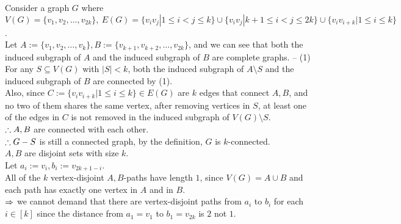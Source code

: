 \setcounter{pr}{0}
\begin{pr}
Consider a graph $G$ where $V(G)=\{v_1, v_2, \dots, v_{2k}\},\ E(G)=\{v_iv_j|1\leq i<j\leq k\}\cup\{v_iv_j|k+1\leq i<j\leq2k\}\cup\{v_iv_{i+k}|1\leq i\leq k\}$.\\
Let $A:=\{v_1, v_2, \dots, v_k\}, B:=\{v_{k+1}, v_{k+2}, \dots, v_{2k}\}$, and we can see that both the induced subgraph of $A$ and the induced subgraph of $B$ are complete graphs. -- (1)\\
For any $S\subseteq V(G)$ with $|S|<k$, both the induced subgraph of $A\setminus S$ and the induced subgraph of $B$ are connected by (1).\\
Also, since $C:=\{v_iv_{i+k}|1\leq i\leq k\}\in E(G)$ are $k$ edges that connect $A, B$, and no two of them shares the same vertex, after removing vertices in $S$, at least one of the edges in $C$ is not removed in the induced subgraph of $V(G)\setminus S$.\\
$\therefore A, B$ are connected with each other.\\
$\therefore G-S$ is still a connected graph, by the definition, $G$ is $k$-connected.\\
$A, B$ are disjoint sets with size $k$.\\
Let $a_i:=v_i, b_i:=v_{2k+1-i}$.\\
All of the $k$ vertex-disjoint $A, B$-paths have length $1$, since $V(G)=A\cup B$ and each path has exactly one vertex in $A$ and in $B$.\\
$\Rightarrow$ we cannot demand that there are vertex-disjoint paths from $a_i$ to $b_i$ for each $i\in[k]$ since the distance from $a_1=v_1$ to $b_1=v_{2k}$ is $2$ not $1$.
\end{pr}

